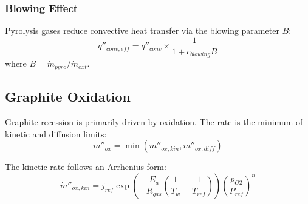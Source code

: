 \subsubsection{Blowing Effect}
Pyrolysis gases reduce convective heat transfer via the blowing parameter \(B\):
\begin{equation}
q''_{conv,eff} = q''_{conv} \times \frac{1}{1 + c_{blowing} B}
\end{equation}
where \(B = \dot{m}_{pyro} / \dot{m}_{ext}\).

\subsection{Graphite Oxidation}
Graphite recession is primarily driven by oxidation. The rate is the minimum of kinetic and diffusion limits:
\begin{equation}
\dot{m}''_{ox} = \min(\dot{m}''_{ox,kin}, \dot{m}''_{ox,diff})
\end{equation}

The kinetic rate follows an Arrhenius form:
\begin{equation}
\dot{m}''_{ox,kin} = j_{ref} \exp\left( -\frac{E_a}{R_{gas}} \left( \frac{1}{T_w} - \frac{1}{T_{ref}} \right) \right) \left( \frac{p_{O2}}{P_{ref}} \right)^n
\end{equation}

